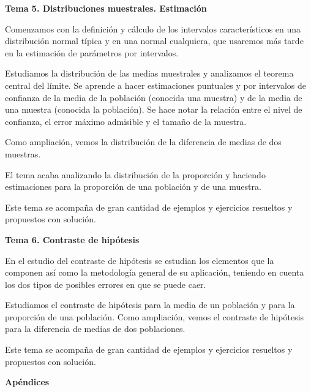 \textbf{Tema 5. Distribuciones muestrales. Estimación}

\begin{adjustwidth}{50pt}{25pt}
Comenzamos con la definición y cálculo de los intervalos característicos en una distribución normal típica y en una normal cualquiera, que usaremos más tarde en la estimación de parámetros por intervalos.

Estudiamos la distribución de las medias muestrales y analizamos el teorema central del límite. Se aprende a hacer estimaciones puntuales y por intervalos de confianza de la media de la población (conocida una muestra) y de la media de una muestra (conocida la población). Se hace notar la relación entre el nivel de confianza, el error máximo admisible y el tamaño de la muestra.

Como ampliación, vemos la distribución de la diferencia de medias de dos muestras.

El tema acaba analizando la distribución de la proporción y haciendo estimaciones para la proporción de una población y de una muestra.

Este tema se acompaña de gran cantidad de ejemplos y ejercicios resueltos y propuestos con solución.
\end{adjustwidth}

\textbf{Tema 6. Contraste de hipótesis}

\begin{adjustwidth}{50pt}{25pt}

En el estudio del contraste de hipótesis se estudian los elementos que la componen así como la metodología general de su aplicación, teniendo en cuenta los dos tipos de posibles errores en que se puede caer.

Estudiamos el contraste de hipótesis para la media de un población y para la proporción de una población. Como ampliación, vemos el contraste de hipótesis para la diferencia de medias de dos poblaciones.

Este tema se acompaña de gran cantidad de ejemplos y ejercicios resueltos y propuestos con solución.
\end{adjustwidth}

\textbf{Apéndices}

